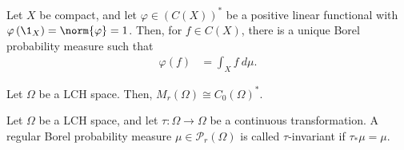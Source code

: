 \begin{theorem}
  Let $X$ be compact, and let $\varphi\in \left(C\left(X\right)\right)^{\ast}$ be a positive linear functional with $\varphi\left(\1_{X}\right) = \norm{\varphi} = 1$. Then, for $f\in C(X)$, there is a unique Borel probability measure such that
  \begin{align*}
    \varphi\left(f\right) &= \int_{X}^{} f\:d\mu.
  \end{align*}
\end{theorem}
\begin{theorem}
  Let $\Omega$ be a LCH space. Then, $M_r\left(\Omega\right)\cong C_0\left(\Omega\right)^{\ast}$.
\end{theorem}
\begin{definition}
  Let $\Omega$ be a LCH space, and let $\tau\colon \Omega\rightarrow \Omega$ be a continuous transformation. A regular Borel probability measure $\mu\in \mathcal{P}_{r}\left(\Omega\right)$ is called $\tau$-invariant if $\tau_{\ast}\mu = \mu$.
\end{definition}
